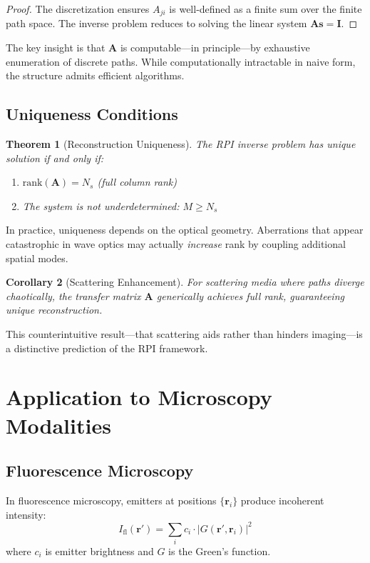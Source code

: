 \documentclass[twocolumn,10pt,a4paper]{article}
\newtheorem{theorem}{Theorem}[section]
\newtheorem{corollary}[theorem]{Corollary}
\begin{document}
\begin{proof}
The discretization ensures $A_{ji}$ is well-defined as a finite sum over the finite path space. The inverse problem reduces to solving the linear system $\mathbf{A}\mathbf{s} = \mathbf{I}$.
\end{proof}

The key insight is that $\mathbf{A}$ is computable---in principle---by exhaustive enumeration of discrete paths. While computationally intractable in naive form, the structure admits efficient algorithms.

\subsection{Uniqueness Conditions}

\begin{theorem}[Reconstruction Uniqueness]
The RPI inverse problem has unique solution if and only if:
\begin{enumerate}
    \item $\text{rank}(\mathbf{A}) = N_s$ (full column rank)
    \item The system is not underdetermined: $M \geq N_s$
\end{enumerate}
\end{theorem}

In practice, uniqueness depends on the optical geometry. Aberrations that appear catastrophic in wave optics may actually \emph{increase} rank by coupling additional spatial modes.

\begin{corollary}[Scattering Enhancement]
For scattering media where paths diverge chaotically, the transfer matrix $\mathbf{A}$ generically achieves full rank, guaranteeing unique reconstruction.
\end{corollary}

This counterintuitive result---that scattering aids rather than hinders imaging---is a distinctive prediction of the RPI framework.

\section{Application to Microscopy Modalities}

\subsection{Fluorescence Microscopy}

In fluorescence microscopy, emitters at positions $\{\mathbf{r}_i\}$ produce incoherent intensity:
\begin{equation}
I_{\text{fl}}(\mathbf{r}') = \sum_i c_i \cdot |G(\mathbf{r}', \mathbf{r}_i)|^2
\end{equation}
where $c_i$ is emitter brightness and $G$ is the Green's function.
\end{document}
